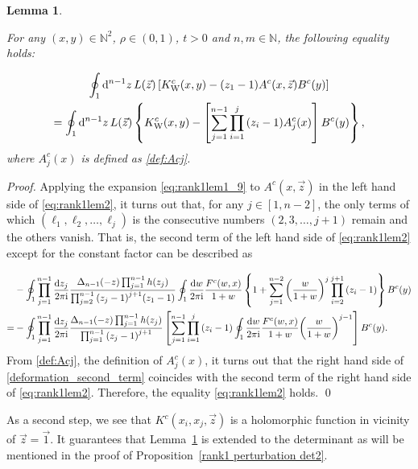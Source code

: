 \documentclass[cmp]{svjour}
\numberwithin{theorem}{section}
\numberwithin{equation}{section}
\def\dd{{\rm d}}
\def\ii{{\rm i}}
\newtheorem{lemman}[theorem]{Lemma}
\begin{document}
\medskip

\begin{lemman}
\label{rank1 perturbation term2}

For any $(x , y) \in \mathbb{N}^2$, $\rho \in (0,1)$, $t > 0$ and $n, m \in \mathbb{N}$, the following equality holds:

\begin{multline}\label{eq:rank1lem2}
\oint_{1} \dd^{n-1} z\, L(\vec{z}) \left[ K_{\mathrm{W}}^c(x, y) - (z_1 - 1) A^c(x , \vec{z} )  B^c(y) \right] \\
= \oint_{1} \dd^{n-1} z\, L(\vec{z}) \left\{ K_{\mathrm{W}}^c(x, y) - \left[ \sum_{j=1}^{n-1}{ \prod_{i=1}^{j}{ {(z_i - 1)} A_j^c(x) }} \right] B^c(y) \right\},
\end{multline}
where $A_j^c(x)$ is defined as \eqref{def:Acj}.

\end{lemman}

\begin{proof}

Applying the expansion \eqref{eq:rank1lem1_9} to $A^c(x, \vec{z})$ in the left hand side of \eqref{eq:rank1lem2}, it turns out that, for any $j \in [1, n-2]$, the only terms of which $(\ell_1, \ell_2, \dots, \ell_j)$ is the consecutive numbers $(2 , 3, \ldots , j+1)$ remain and the others vanish.
That is, the second term of the left hand side of \eqref{eq:rank1lem2} except for the constant factor can be described as

\begin{equation}
\label{deformation_second_term}
\begin{split}
& - \oint_{1} \prod_{j=1}^{n-1}{ \frac{\dd z_j}{2 \pi \ii} } \frac{ \Delta_{n-1}(-z) \prod_{j=1}^{n-1}{h(z_j)} }{ \prod_{j=2}^{n-1}{{(z_j -1)}^{j+1}} (z_1 - 1) }  \oint_{1} \frac{\dd w}{2 \pi \ii} \frac{F^c(w, x)}{1+w} \left\{ 1  +   \sum_{j=1}^{n-2}{ { \left( \frac{w}{1 + w} \right) }^{j} \prod_{i=2}^{j + 1}{ (z_{i} - 1) } }  \right\} B^c(y) \\
= & - \oint_{1} \prod_{j=1}^{n-1}{ \frac{\dd z_j}{2 \pi \ii} } \frac{ \Delta_{n-1}(-z)\prod_{j=1}^{n-1}{h(z_j)} }{ \prod_{j=1}^{n-1}{{(z_j -1)}^{j+1}}} \left[ \sum_{j=1}^{n-1}{ \prod_{i=1}^{j}{(z_i - 1)} \oint_{1} \frac{\dd w}{2 \pi \ii} \frac{F^c(w, x)}{1+w} { \left( \frac{w}{1 + w} \right) }^{j-1} } \right] B^c(y).
\end{split}
\end{equation}
From \eqref{def:Acj}, the definition of $A_j^c(x)$, it turns out that the right hand side of \eqref{deformation_second_term} coincides with the second term of the right hand side of \eqref{eq:rank1lem2}.
Therefore, the equality \eqref{eq:rank1lem2} holds.
\qed
\end{proof}
As a second step, we see that $K^c(x_i, x_j ,\vec{z})$ is a holomorphic function in vicinity of $\vec{z} = \vec{1}$.
It guarantees that Lemma~\ref{rank1 perturbation term2} is extended to the determinant as will be mentioned in the proof of Proposition~\ref{rank1 perturbation det2}. 
\end{document}
